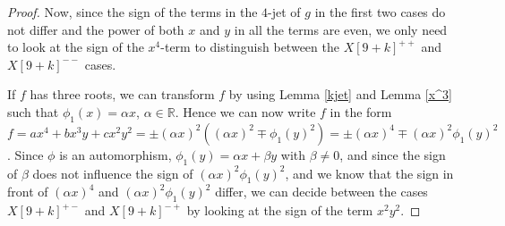 \documentclass{amsproc}
\begin{document}
\begin{proof}
Now, since the sign of the terms in the $4$-jet of $g$ in the first two cases do not differ and the power of both $x$ and $y$ in all the terms are even, we only need to look at the sign of the $x^4$-term to distinguish between the $X[9+k]^{++}$ and $X[9+k]^{--}$ cases.

If $f$ has three roots, we can transform $f$ by using Lemma \ref{kjet} and Lemma
\ref{x^3} such that $\phi_1(x)=\alpha x$, $\alpha\in\mathbb R$. Hence we can now
write $f$ in the form $f=ax^4+bx^3y+cx^2y^2=\pm(\alpha x)^2((\alpha
x)^2\mp\phi_1(y)^2)=\pm(\alpha x)^4\mp (\alpha x)^2\phi_1(y)^2$. Since $\phi$ is
an automorphism, $\phi_1(y)=\alpha x+\beta y$ with $\beta \neq 0$, and since the sign of $\beta$ does not influence the sign of $(\alpha x)^2\phi_1(y)^2$, and we know that the sign in front of $(\alpha x)^4$ and $(\alpha x)^2\phi_1(y)^2$ differ, we can decide between the cases $X[9+k]^{+-}$ and $X[9+k]^{-+}$ by looking at the sign of the term $x^2y^2$.
\end{proof}
\end{document}
